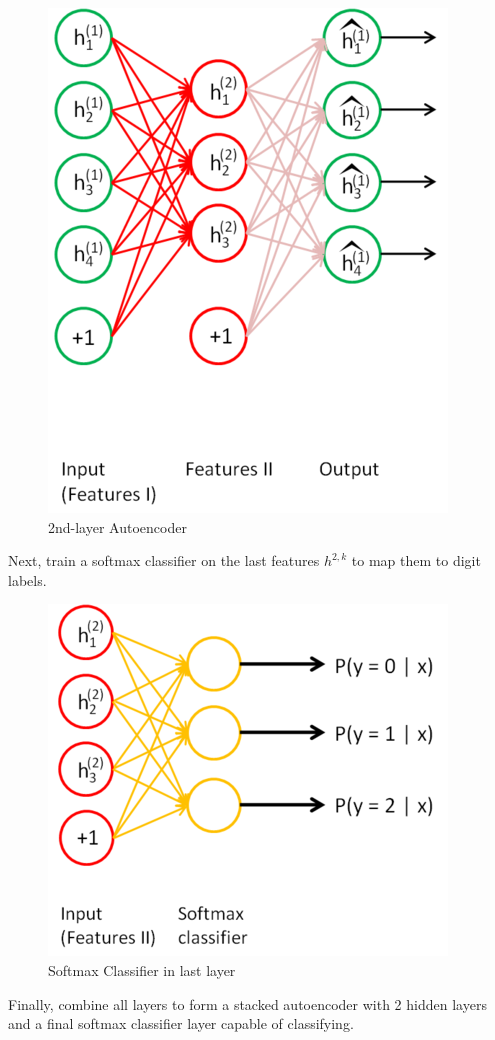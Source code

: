 \documentclass{beamer}
\begin{document}
\begin{CJK*}{UTF8}{gbsn}
\begin{frame}[allowframebreaks]
\begin{figure}
\includegraphics[scale=0.6]{images/Stacked_SparseAE_Features2}
\caption{2nd-layer Autoencoder}
\end{figure}
Next, train a softmax classifier on the last features $h^{2,k}$ to map them to digit labels.
\begin{figure}
\centering
\includegraphics[scale=0.7]{images/Stacked_Softmax_Classifier}
\caption{Softmax Classifier in last layer}
\end{figure}
Finally, combine all layers to form a stacked autoencoder with 2 hidden layers and a final softmax classifier layer capable of classifying.

\end{frame}
\end{CJK*}
\end{document}
